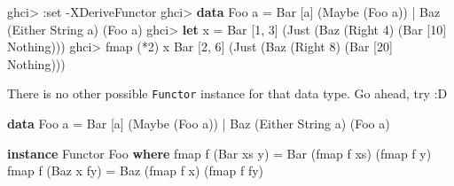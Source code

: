 \documentclass[]{article}
\newenvironment{Shaded}{}{}
\newcommand{\DataTypeTok}[1]{\textcolor[rgb]{0.56,0.13,0.00}{#1}}
\newcommand{\DecValTok}[1]{\textcolor[rgb]{0.25,0.63,0.44}{#1}}
\newcommand{\FunctionTok}[1]{\textcolor[rgb]{0.02,0.16,0.49}{#1}}
\newcommand{\KeywordTok}[1]{\textcolor[rgb]{0.00,0.44,0.13}{\textbf{#1}}}
\newcommand{\NormalTok}[1]{#1}
\newcommand{\OperatorTok}[1]{\textcolor[rgb]{0.40,0.40,0.40}{#1}}
\newcommand{\OtherTok}[1]{\textcolor[rgb]{0.00,0.44,0.13}{#1}}
\begin{document}
\begin{Shaded}
\begin{Highlighting}[]
\NormalTok{ghci}\OperatorTok{>} \OperatorTok{:}\NormalTok{set }\OperatorTok{{-}}\DataTypeTok{XDeriveFunctor}
\NormalTok{ghci}\OperatorTok{>} \KeywordTok{data} \DataTypeTok{Foo}\NormalTok{ a }\OtherTok{=} \DataTypeTok{Bar}\NormalTok{ [a] (}\DataTypeTok{Maybe}\NormalTok{ (}\DataTypeTok{Foo}\NormalTok{ a)) }\OperatorTok{|} \DataTypeTok{Baz}\NormalTok{ (}\DataTypeTok{Either} \DataTypeTok{String}\NormalTok{ a) (}\DataTypeTok{Foo}\NormalTok{ a)}
\NormalTok{ghci}\OperatorTok{>} \KeywordTok{let}\NormalTok{ x }\OtherTok{=} \DataTypeTok{Bar}\NormalTok{ [}\DecValTok{1}\NormalTok{, }\DecValTok{3}\NormalTok{] (}\DataTypeTok{Just}\NormalTok{ (}\DataTypeTok{Baz}\NormalTok{ (}\DataTypeTok{Right} \DecValTok{4}\NormalTok{) (}\DataTypeTok{Bar}\NormalTok{ [}\DecValTok{10}\NormalTok{] }\DataTypeTok{Nothing}\NormalTok{)))}
\NormalTok{ghci}\OperatorTok{>} \FunctionTok{fmap}\NormalTok{ (}\OperatorTok{*}\DecValTok{2}\NormalTok{) x}
\DataTypeTok{Bar}\NormalTok{ [}\DecValTok{2}\NormalTok{, }\DecValTok{6}\NormalTok{] (}\DataTypeTok{Just}\NormalTok{ (}\DataTypeTok{Baz}\NormalTok{ (}\DataTypeTok{Right} \DecValTok{8}\NormalTok{) (}\DataTypeTok{Bar}\NormalTok{ [}\DecValTok{20}\NormalTok{] }\DataTypeTok{Nothing}\NormalTok{)))}
\end{Highlighting}
\end{Shaded}

There is no other possible \texttt{Functor} instance for that data type. Go
ahead, try :D

\begin{Shaded}
\begin{Highlighting}[]
\KeywordTok{data} \DataTypeTok{Foo}\NormalTok{ a }\OtherTok{=} \DataTypeTok{Bar}\NormalTok{ [a] (}\DataTypeTok{Maybe}\NormalTok{ (}\DataTypeTok{Foo}\NormalTok{ a)) }\OperatorTok{|} \DataTypeTok{Baz}\NormalTok{ (}\DataTypeTok{Either} \DataTypeTok{String}\NormalTok{ a) (}\DataTypeTok{Foo}\NormalTok{ a)}

\KeywordTok{instance} \DataTypeTok{Functor} \DataTypeTok{Foo} \KeywordTok{where}
    \FunctionTok{fmap}\NormalTok{ f (}\DataTypeTok{Bar}\NormalTok{ xs y) }\OtherTok{=} \DataTypeTok{Bar}\NormalTok{ (}\FunctionTok{fmap}\NormalTok{ f xs) (}\FunctionTok{fmap}\NormalTok{ f y)}
    \FunctionTok{fmap}\NormalTok{ f (}\DataTypeTok{Baz}\NormalTok{ x fy) }\OtherTok{=} \DataTypeTok{Baz}\NormalTok{ (}\FunctionTok{fmap}\NormalTok{ f x) (}\FunctionTok{fmap}\NormalTok{ f fy)}
\end{Highlighting}
\end{Shaded}
\end{document}
